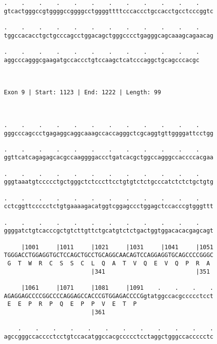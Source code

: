 \documentclass{article}
\begin{document}
\begin{Verbatim}
.    .    .    .    .    .    .    .    .    .    .    .    
gtcactgggccgtggggccggggcctggggttttcccaccctgccacctgcctcccggtc
                                                            
.    .    .    .    .    .    .    .    .    .    .    .    
tggccacacctgctgcccagcctggacagctgggcccctgagggcagcaaagcagaacag
                                                            
.    .    .    .    .    .    .    .    .    .    .    .
aggcccagggcgaagatgccaccctgtccaagctcatcccaggctgcagcccacgc
                                                        
                                                        
 
Exon 9 | Start: 1123 | End: 1222 | Length: 99



.    .    .    .    .    .    .    .    .    .    .    .    
gggcccagccctgagaggcaggcaaagccaccagggctcgcaggtgttggggattcctgg
                                                            
.    .    .    .    .    .    .    .    .    .    .    .    
ggttcatcagagagcacgccaaggggaccctgatcacgctggccagggccaccccacgaa
                                                            
.    .    .    .    .    .    .    .    .    .    .    .    
gggtaaatgtccccctgctgggctctcccttcctgtgtctctgcccatctctctgctgtg
                                                            
.    .    .    .    .    .    .    .    .    .    .    .    
cctcggttccccctctgtgaaaagacatggtcggagccctggagctccacccgtgggttt
                                                            
.    .    .    .    .    .    .    .    .    .    .    .    
ggggatctgtcacccgctgtcttgttctgcatgtctctgactggtggacacacgagcagt
                                                            
     |1001     |1011     |1021     |1031     |1041     |1051
TGGGACCTGGAGGTGCTCCAGCTGCCTGCAGGCAACAGTCCAGGAGGTGCAGCCCCGGGC
 G  T  W  R  C  S  S  C  L  Q  A  T  V  Q  E  V  Q  P  R  A 
                         |341                          |351 
  
     |1061     |1071     |1081     |1091    .    .    .    .
AGAGGAGCCCCGGCCCCAGGAGCCACCCGTGGAGACCCCGgtatggccacgccccctcct
 E  E  P  R  P  Q  E  P  P  V  E  T  P                      
                         |361                               
  
    .    .    .    .    .    .    .    .    .    .    .    .
agccgggccacccctcctgtccacatggccacgccccctcctaggctgggccaccccctc
                                                            

\end{Verbatim}
\end{document}
